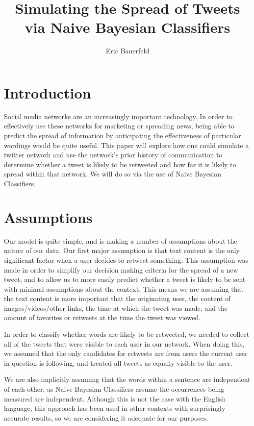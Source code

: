 \documentclass{article}
\author{Eric Bauerfeld}
\title{Simulating the Spread of Tweets via Naive Bayesian Classifiers}
\begin{document}
\maketitle

\newpage

\section{Introduction}

Social media networks are an increasingly important technology. In order to effectively use these networks for marketing or spreading news, being able to predict the spread of information by anticipating the effectiveness of particular wordings would be quite useful. This paper will explore how one could simulate a twitter network and use the network's prior history of communication to determine whether a tweet is likely to be retweeted and how far it is likely to spread within that network. We will do so via the use of Naive Bayesian Classifiers.

\section{Assumptions}

Our model is quite simple, and is making a number of assumptions about the nature of our data. Our first major assumption is that text content is the only significant factor when a user decides to retweet something. This assumption was made in order to simplify our decision making criteria for the spread of a new tweet, and to allow us to more easily predict whether a tweet is likely to be sent with minimal assumptions about the context. This means we are assuming that the text content is more important that the originating user, the content of images/videos/other links, the time at which the tweet was made, and the amount of favorites or retweets at the time the tweet was viewed.

In order to classify whether words are likely to be retweeted, we needed to collect all of the tweets that were visible to each user in our network. When doing this, we assumed that the only candidates for retweets are from users the current user in question is following, and treated all tweets as equally visible to the user.

We are also implicitly assuming that the words within a sentence are independent of each other, as Naive Bayesian Classifiers assume the occurrences being measured are independent. Although this is not the case with the English language, this approach has been used in other contexts with surprisingly accurate results, so we are considering it adequate for our purposes.
\end{document}
